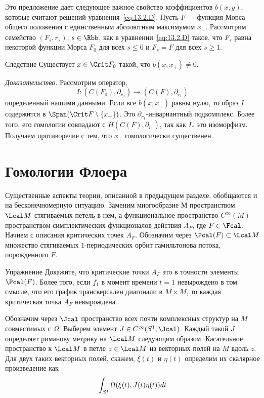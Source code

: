 Это предложение дает следующее важное свойство коэффициентов $b(x,
y)$, которые считают   решений
уравнения~\ref{eq:13.2.D}. 
Пусть $F$ --- функция Морса общего положения с единственным абсолютным
максимумом $x_{+}$.
Рассмотрим семейство $(F_{s},r_{s})$, $s\in\Rbb$, как в
уравнении~\ref{eq:13.2.D} такое, что $F_{s}$ равна некоторой функции
Морса $F_{0}$ для всех $s\leq0$ и $F_{s} = F$ для всех $s\geq1$.


\begin{thm}{Следствие}\label{13.2.H}
  Существует $x\in\Crit F_{0}$ такой, что $b(x, x_{+})\neq0$.  
\end{thm}

\noindent\textit{Доказательство.}
Рассмотрим оператор,
\[
I:(C(F_{0}),\partial_{r_{0}})\to (C(F),\partial_{r_{1}})
\]
определенный нашими данными.
Если все $b(x,x_{+})$ равны нулю, то образ $I$ содержится в
$\Span(\Crit F\setminus\{x_{+}\})$. 
Это $\partial_{r_{1}}$-инвариантный подкомплекс.
Более того, его гомологии совпадают с $H(C(F),\partial_{r_{1}})$,
так как $I_{*}$ это изоморфизм.
Получаем противоречие с тем, что $x_{+}$ гомологически существенен.
\qeds

\section{Гомологии Флоера}\label{sec:13.3}
Существенные аспекты теории, описанной в предыдущем разделе,
обобщаются и на бесконечномерную ситуацию.  Заменим многообразие $М$
пространством $\Lcal M$ стягиваемых петель в нём, а функциональное
пространство $C^{\infty}(M)$ пространством симплектических
функционалов действия $A_{F}$, где $F\in\Fcal$.
Начнем с описания критических точек $A_{F}$.
Обозначим через $\Pcal(F)\subset\Lcal M$ множество стягиваемых
$1$-периодических орбит гамильтонова потока, порожденного $F$.

\begin{ex}{Упражнение}\label{13.3.A}
  Докажите, что критические точки $A_{F}$ это в точности элементы
  $\Pcal(F)$.
  Более того, если  $f_{1}$ в момент времени
    $t=1$ невырождено в том смысле, что его график
  трансверсален диагонали в $M\times M$, то каждая критическая точка
  $A_{F}$ невырождена.
\end{ex}
Обозначим через $\Jcal$ пространство всех почти комплексных структур
на $M$ совместимых с $\Omega$.
Выберем элемент $J\in C^{\infty}(S^{1},\Jcal)$.
Каждый такой $J$ определяет риманову метрику на $\Lcal M$ следующим образом.
Касательное пространство к $\Lcal M$ в петле $z\in\Lcal M$
 из векторных полей на $M$ вдоль $z$.
Для двух таких векторных полей, скажем, $\xi(t)$ и $\eta(t)$ определим
их скалярное произведение как
\[
\int_{S^{1}}\Omega(\xi(t),J(t)\eta(t))d t
\]

